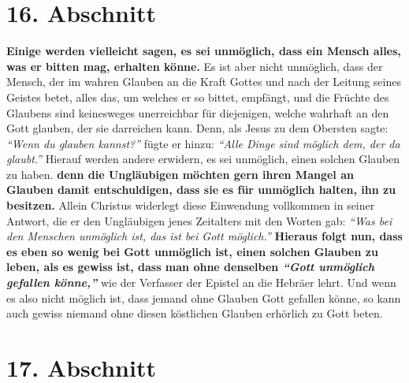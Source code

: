 \section{16. Abschnitt} \label{kap6_ab16}

\label{ref:06_14_gebetserfuellung}
\textbf{Einige werden vielleicht sagen, es sei unmöglich, dass ein Mensch alles,
was er
bitten mag, erhalten könne.} Es ist aber nicht unmöglich, dass der Mensch, der
im
wahren Glauben an die Kraft Gottes und nach der Leitung seines Geistes betet,
alles das, um welches er so bittet, empfängt, und die Früchte des Glaubens sind
keinesweges unerreichbar für diejenigen, welche wahrhaft an den Gott glauben,
der sie darreichen kann. Denn, als Jesus zu dem Obersten sagte:
\textit{"`Wenn du glauben kannst?"'} fügte er hinzu: \textit{"`Alle Dinge sind
möglich dem, der da glaubt."'}
Hierauf werden andere erwidern, es sei
unmöglich, einen solchen Glauben zu haben. \textbf{denn die Ungläubigen möchten
gern
ihren Mangel an Glauben damit entschuldigen, dass
sie es für unmöglich halten,
ihn zu besitzen.} Allein Christus widerlegt diese Einwendung vollkommen in
seiner
Antwort, die er den Ungläubigen jenes Zeitalters mit den Worten gab:
\textit{"`Was bei den Menschen unmöglich ist, das ist bei Gott
möglich."'}
\textbf{Hieraus folgt nun, dass es eben so wenig bei Gott unmöglich
ist,
einen solchen Glauben zu leben, als es gewiss ist, dass man ohne denselben
\textit{"`Gott unmöglich gefallen könne,"'}} wie der Verfasser der Epistel an
die Hebräer
lehrt. Und wenn es also nicht möglich ist, dass jemand ohne Glauben Gott
gefallen könne, so kann auch gewiss niemand ohne diesen köstlichen Glauben
erhörlich zu Gott beten.

\section{17. Abschnitt} \label{kap6_ab17}

